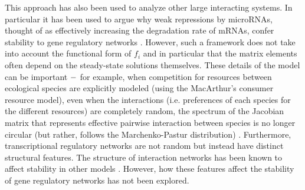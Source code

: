 \documentclass[10pt]{article}
\begin{document}
This approach has also been used to analyze other large interacting systems. In particular it has been used to argue why weak repressions by microRNAs, thought of as effectively increasing the degradation rate of mRNAs, confer stability to gene regulatory networks \cite{chen2019gene, zhao2017weak}. However, such a framework does not take into account the functional form of $f_i$ and in particular that the matrix elements often depend on the steady-state solutions themselves. These details of the model can be important $\--$ for example, when competition for resources between ecological species are explicitly modeled (using the MacArthur's consumer resource model), even when the interactions (i.e. preferences of each species for the different resources) are completely random, the spectrum of the Jacobian matrix that represents effective pairwise interaction between species is no longer circular (but rather, follows the Marchenko-Pastur distribution) \cite{cui2019diverse}. Furthermore, transcriptional regulatory networks are not random but instead have distinct structural features. The structure of interaction networks has been known to affect stability in other models \cite{allesina2012stability, thebault2010stability, okuyama2008network, cui2019diverse}. However, how these features affect the stability of gene regulatory networks has not been explored.

\end{document}
